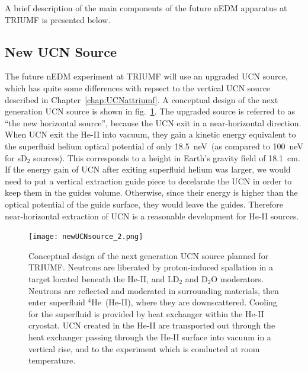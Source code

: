 A brief description of the main components of the future nEDM apparatus
at TRIUMF is presented below.

\subsection{New UCN Source\label{sec:newUCNsource}}


The future nEDM experiment at TRIUMF will use an upgraded UCN source,
which has quite some differences with repsect to the vertical UCN
source described in Chapter~\ref{chap:UCNattriumf}. A conceptual
design of the next generation UCN source is shown in
fig.~\ref{fig:newUCNsource_2}. The upgraded source is referred to as
``the new horizontal source'', because the UCN exit in a
near-horizontal direction. When UCN exit the He-II into vacuum, they
gain a kinetic energy equivalent to the superfluid helium optical
potential of only 18.5~neV~(as compared to 100~neV for sD$_2$
sources). This corresponds to a height in Earth’s gravity field of
18.1~cm. If the energy gain of UCN after exiting superfluid helium was
larger, we would need to put a vertical extraction guide piece to
decelarate the UCN in order to keep them in the guides
volume. Otherwise, since their energy is higher than the optical
potential of the guide surface, they would leave the guides.
Therefore near-horizontal extraction of UCN is a reasonable
development for He-II sources.

\begin{figure}[h!]
  \centering
  \texttt{[image: newUCNsource\_2.png]}
  \caption[Conceptual design of TUCAN's new UCN source]{Conceptual
    design of the next generation UCN source planned for
    TRIUMF. Neutrons are liberated by proton-induced spallation in a
    target located beneath the He-II, and LD$_2$ and D$_2$O
    moderators. Neutrons are reflected and moderated in surrounding
    materials, then enter superfluid $^4$He~(He-II), where they are
    downscattered. Cooling for the superfluid is provided by heat
    exchanger within the He-II cryostat. UCN created in the He-II are
    transported out through the heat exchanger passing through the
    He-II surface into vacuum in a vertical rise, and to the
    experiment which is conducted at room temperature.}
  \label{fig:newUCNsource_2}
\end{figure}


